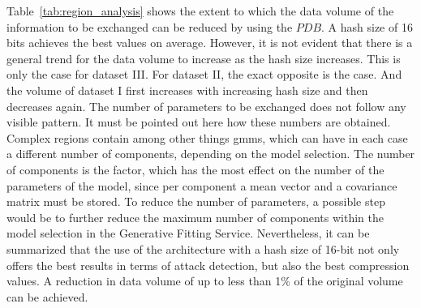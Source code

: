 \documentclass[../../main.tex]{subfiles}
\begin{document}
Table~\ref{tab:region_analysis} shows the extent to which the data volume of the information to be exchanged can be reduced by using the $PDB$. A hash size of 16 bits achieves the best values on average. However, it is not evident that there is a general trend for the data volume to increase as the hash size increases. This is only the case for dataset III. For dataset II, the exact opposite is the case. And the volume of dataset I first increases with increasing hash size and then decreases again. The number of parameters to be exchanged does not follow any visible pattern. It must be pointed out here how these numbers are obtained. Complex regions contain among other things \glspl{gmm}, which can have in each case a different number of components, depending on the model selection. The number of components is the factor, which has the most effect on the number of the parameters of the model, since per component a mean vector and a covariance matrix must be stored. To reduce the number of parameters, a possible step would be to further reduce the maximum number of components within the model selection in the Generative Fitting Service. Nevertheless, it can be summarized that the use of the architecture with a hash size of 16-bit not only offers the best results in terms of attack detection, but also the best compression values. A reduction in data volume of up to less than 1\% of the original volume can be achieved. 
\end{document}
